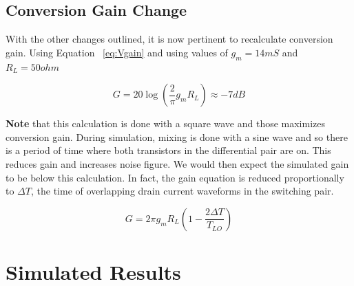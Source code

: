 \documentclass{article}                                                         %
\begin{document}
\subsection{Conversion Gain Change}
With the other changes outlined, it is now pertinent to recalculate conversion gain. Using Equation ~\ref{eq:Vgain} and using
values of $g_m = 14mS$ and $R_L = 50 ohm$

\begin{equation}
  \label{eq:gaintargetnew}
  G = 20\log(\dfrac{2}{\pi}g_mR_L) \approx -7dB
\end{equation}

\vspace{3mm}\textbf{Note} that this calculation is done with a square wave and those maximizes
conversion gain. During simulation, mixing is done with a sine wave and so there is a period of time
where both transistors in the differential pair are on. This reduces gain and increases noise figure.
We would then expect the simulated gain to be below this calculation. In fact, the gain equation is reduced
proportionally to $\Delta T$, the time of overlapping drain current waveforms in the switching pair.

\begin{equation}
  \label{eq:gaintargetnew}
  G = 2\pi g_m R_L (1 -\dfrac{2\Delta T}{T_{LO}})
\end{equation}

\newpage
\section{Simulated Results}
\end{document}
